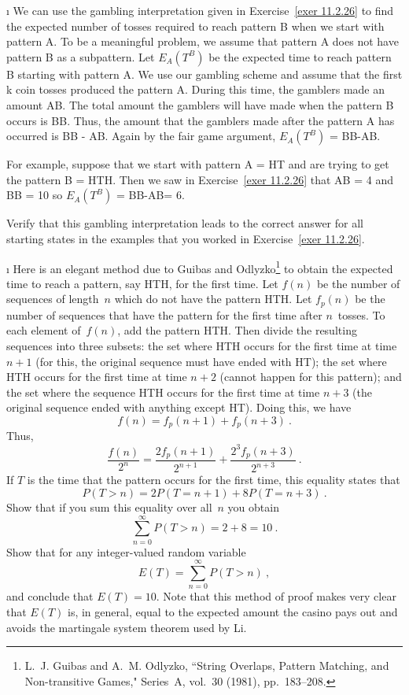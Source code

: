 \begin{LJSItem}
\i\label{exer 11.2.27} We can use the gambling
interpretation given in Exercise~\ref{exer 11.2.26} to find the expected
number of tosses required to reach pattern B when we start with pattern
A.  To be a meaningful problem, 
we assume that pattern A does not have pattern B as a subpattern.  Let
$E_A(T^B)$ be
the expected time to reach pattern B starting with pattern A.   We 
use our gambling scheme and assume that the first k coin tosses produced
the pattern A.  During this time, the gamblers made an amount AB.
The total amount the gamblers will have made
when the pattern B occurs
is BB.  Thus, the amount that the gamblers made after
the pattern A has occurred is  BB - AB.  Again by the fair game argument,
$E_A(T^B)$ = BB-AB. 
\par
For example, suppose that we start with pattern A = HT and  are trying to get
the pattern B = HTH.  Then we saw in Exercise~\ref{exer
11.2.26} that AB = 4 and BB = 10 so $E_A(T
^B)$ = BB-AB=
6. 
\par
Verify that this gambling interpretation
leads to the correct answer for all starting states in the examples that you
worked in Exercise~\ref{exer 11.2.26}.

\i\label{exer 11.2.28} Here is an elegant method due to Guibas and
Odlyzko\footnote{L.~J.
Guibas and A.~M. Odlyzko, ``String Overlaps, Pattern Matching, and
Non-transitive Games,"
 Series~A, vol.~30 (1981),
pp.~183--208.} to obtain
the expected time to reach a pattern, say HTH, for the first time.  Let $f(n)$
be the
number of sequences of length~$n$ which do not have the pattern HTH.  Let
$f_p(n)$ be the
number of sequences that have the pattern for the first time after $n$~tosses. 
To each
element of~$f(n)$, add the pattern HTH.  Then divide the resulting sequences
into three subsets: the set where HTH occurs for the first time at time $n + 1$
(for this, the original sequence must have ended with HT); the set where HTH
occurs for the first time at time $n + 2$ (cannot happen for this pattern); and
the set where the sequence HTH occurs for the first time at time $n + 3$ (the
original sequence ended with anything except HT).  Doing this, we have
$$
f(n) = f_p(n + 1) + f_p(n + 3)\ .
$$
Thus,
$$
\frac{f(n)}{2^n} = \frac{2f_p(n + 1)}{2^{n + 1}} + \frac{2^3f_p(n + 3)}{2^{n +
3}}\ .
$$
If $T$ is the time that the pattern occurs for the first time, this equality
states that
$$
P(T > n) = 2P(T = n + 1) + 8P(T = n + 3)\ .
$$
Show that if you sum this equality over all~$n$ you obtain
$$
\sum_{n = 0}^\infty P(T > n) = 2 + 8 = 10\ .
$$
Show that for any integer-valued random variable
$$
E(T) = \sum_{n = 0}^\infty P(T > n)\ ,
$$
and conclude that $E(T) = 10$.  Note that this method of proof makes very
clear that $E(T)$ is, in general, equal to the expected amount the casino pays
out and avoids the martingale system theorem used by Li.


\end{LJSItem}

